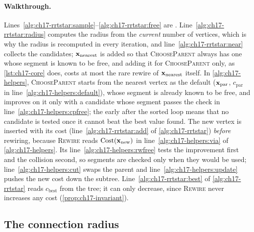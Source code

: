 \paragraph{Walkthrough.} Lines~\ref{alg:ch17-rrtstar:sample}--\ref{alg:ch17-rrtstar:free}
are \rrt. Line~\ref{alg:ch17-rrtstar:radius} computes the radius from the
\emph{current} number of vertices, which is why the radius is recomputed in
every iteration, and line~\ref{alg:ch17-rrtstar:near} collects the
candidates; $\mathbf{x}_{\mathrm{nearest}}$ is added so that \textsc{ChooseParent}
always has one whose segment is known to be free, and adding it for
\textsc{ChooseParent} only, as \cref{lst:ch17-core} does, costs at most the
rare rewire of $\mathbf{x}_{\mathrm{nearest}}$ itself. In \cref{alg:ch17-helpers}, \textsc{ChooseParent} starts from
the nearest vertex as the default ($\mathbf{x}_{\mathrm{par}}$, $c_{\mathrm{par}}$ in
line~\ref{alg:ch17-helpers:default}),
whose segment is already known to be free, and improves on it only with a
candidate whose segment passes the check in
line~\ref{alg:ch17-helpers:cpfree}; the early \KwBreak after the sorted loop
means that no candidate is tested once it cannot beat the best value found.
The new vertex is inserted with its cost (line~\ref{alg:ch17-rrtstar:add} of
\cref{alg:ch17-rrtstar}) \emph{before} rewiring, because \textsc{Rewire}
reads $\mathrm{Cost}(\mathbf{x}_{\mathrm{new}})$ in line~\ref{alg:ch17-helpers:via}
of \cref{alg:ch17-helpers}. Its line~\ref{alg:ch17-helpers:rwfree} tests the
improvement first and the collision second, so segments are checked only
when they would be used; line~\ref{alg:ch17-helpers:cut} swaps the parent
and line~\ref{alg:ch17-helpers:update} pushes the new cost down the subtree.
Line~\ref{alg:ch17-rrtstar:best} of \cref{alg:ch17-rrtstar} reads
$c_{\mathrm{best}}$ from the tree; it can only decrease, since
\textsc{Rewire} never increases any cost (\cref{prop:ch17-invariant}).

\subsection{The connection radius}
\label{sec:ch17-radius}

